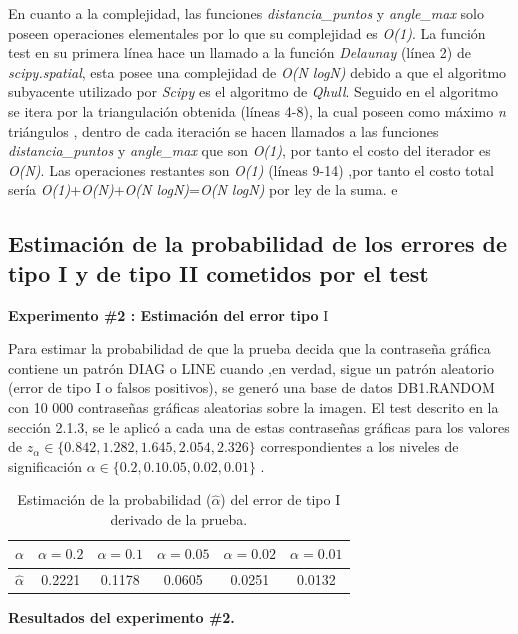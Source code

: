 \documentclass[12pt]{report}
\begin{document}
En cuanto a la complejidad, las funciones \textit{distancia\_puntos} y \textit{angle\_max} solo poseen operaciones elementales por lo que su complejidad es \textit{O(1)}. La función test en su primera línea hace un llamado a la función  \textit{Delaunay} (línea 2) de \textit{scipy.spatial}, esta posee una complejidad de \textit{O(N logN)} debido a que el algoritmo subyacente utilizado por \textit{Scipy} es el algoritmo de \textit{Qhull}. Seguido en el algoritmo se itera por la triangulación obtenida (líneas 4-8), la cual poseen como máximo \textit{n} triángulos , dentro de cada iteración se hacen llamados a las  funciones \textit{distancia\_puntos} y \textit{angle\_max}  que son \textit{O(1)}, por tanto el costo del iterador es \textit{O(N)}. Las operaciones restantes son \textit{O(1)} (líneas 9-14) ,por tanto el costo total sería \textit{O(1)}+\textit{O(N)}+\textit{O(N logN)}=\textit{O(N logN)} por ley de la suma.
e\subsection{Estimación de la probabilidad de los errores de tipo I y de tipo II  cometidos por el test}	 
	\textbf{Experimento \#2 : Estimación del error tipo} I
	
	Para estimar la probabilidad de que la prueba decida que la contraseña gráfica contiene un patrón DIAG o LINE cuando ,en verdad, sigue un patrón aleatorio (error de tipo I o falsos positivos), se generó una base de datos DB1.RANDOM con 10 000 contraseñas gráficas aleatorias sobre la imagen. El test descrito en la sección 2.1.3, se le aplicó a cada una de estas contraseñas gráficas para los valores de $z_\alpha \in \{0.842, 1.282, 1.645, 2.054, 2.326\}$ correspondientes a los niveles de significación $\alpha \in \{0.2, 0.1 0.05, 0.02 , 0.01\}$ .
	
\begin{table}[h!]
	\centering
	\begin{tabular}{|c|ccccc|}
		\hline
		$\alpha$ & $\alpha = 0.2$ & $\alpha = 0.1$ & $\alpha = 0.05$ & $\alpha = 0.02$ & $\alpha = 0.01$ \\
		\hline
		$\hat{\alpha}$ & 0.2221 & 0.1178 & 0.0605 & 0.0251 & 0.0132 \\
		\hline
	\end{tabular}
	\caption{Estimación de la probabilidad ($\hat{\alpha}$) del error de tipo I derivado de la prueba.}
	\label{3td:error1-prob}
\end{table}

\textbf{Resultados del experimento \#2.}
\end{document}
